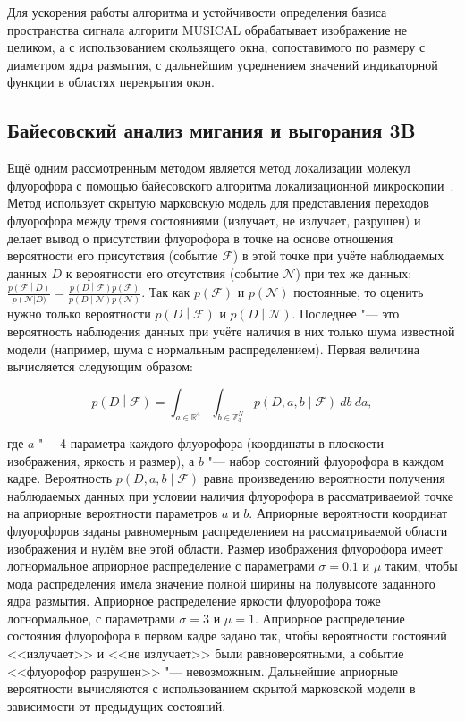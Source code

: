 Для ускорения работы алгоритма и устойчивости определения базиса пространства сигнала алгоритм MUSICAL обрабатывает изображение не целиком, а с использованием скользящего окна, сопоставимого по размеру с диаметром ядра размытия, с дальнейшим усреднением значений индикаторной функции в областях перекрытия окон.

\subsection{Байесовский анализ мигания и выгорания 3B}

Ещё одним рассмотренным методом является метод локализации молекул флуорофора с помощью байесовского алгоритма локализационной микроскопии~\cite{cox2012bayesian}. Метод использует скрытую марковскую модель для представления переходов флуорофора между тремя состояниями (излучает, не излучает, разрушен) и делает вывод о присутствии флуорофора в точке на основе отношения вероятности его присутствия (событие $\mathcal{F}$) в этой точке при учёте наблюдаемых данных $D$ к вероятности его отсутствия (событие $\mathcal{N}$) при тех же данных: $\frac{p\left(\mathcal{F}\middle| D\right)}{p\left(\mathcal{N}\right|D)} = \frac{p\left(D\middle|\mathcal{F}\right)p\left(\mathcal{F}\right)} {p\left(D\middle|\mathcal{N}\right)p\left(\mathcal{N}\right)}$. Так как $p\left(\mathcal{F}\right)$ и $p\left(\mathcal{N}\right)$ постоянные, то оценить нужно только вероятности $p\left(D\middle|\mathcal{F}\right)$ и $p\left(D\middle|\mathcal{N}\right)$. Последнее "--- это вероятность наблюдения данных при учёте наличия в них только шума известной модели (например, шума с нормальным распределением). Первая величина вычисляется следующим образом:

\begin{equation*}
	p\left(D\middle|\mathcal{F}\right)=\int_{a\in\mathbb{R}^4}\int_{b\in\mathbb{Z}_3^N}{p\left(D,a,b\middle|\mathcal{F}\right)\ db\ da},
\end{equation*}

\noindent где $a$ "--- 4 параметра каждого флуорофора (координаты в плоскости изображения, яркость и размер), а $b$ "--- набор состояний флуорофора в каждом кадре. Вероятность $p\left(D,a,b\middle|\mathcal{F}\right)$ равна произведению вероятности получения наблюдаемых данных при условии наличия флуорофора в рассматриваемой точке на априорные вероятности параметров $a$ и $b$. Априорные вероятности координат флуорофоров заданы равномерным распределением на рассматриваемой области изображения и нулём вне этой области. Размер изображения флуорофора имеет логнормальное априорное распределение с параметрами $\sigma=0.1$ и $\mu$ таким, чтобы мода распределения имела значение полной ширины на полувысоте заданного ядра размытия. Априорное распределение яркости флуорофора тоже логнормальное, с параметрами $\sigma=3$ и $\mu=1$. Априорное распределение состояния флуорофора в первом кадре задано так, чтобы вероятности состояний <<излучает>> и <<не излучает>> были равновероятными, а событие <<флуорофор разрушен>> "--- невозможным. Дальнейшие априорные вероятности вычисляются с использованием скрытой марковской модели в зависимости от предыдущих состояний.

